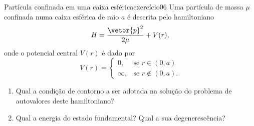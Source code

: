 \begin{exercício}{Partícula confinada em uma caixa esférica}{exercício06}
    Uma partícula de massa \(\mu\) confinada numa caixa esférica de raio \(a\) é descrita pelo hamiltoniano
    \begin{equation*}
        H = \frac{\vetor{p}^2}{2\mu} + V(r),
    \end{equation*}
    onde o potencial central \(V(r)\) é dado por
    \begin{equation*}
        V(r) = \begin{cases}
            0, &\text{se } r \in (0,a)\\
            \infty, &\text{se }r \notin (0,a).
        \end{cases}
    \end{equation*}
    \begin{enumerate}[label=(\alph*)]
        \item Qual a condição de contorno a ser adotada na solução do problema de autovalores deste hamiltoniano?
        \item Qual a energia do estado fundamental? Qual a sua degenerescência?
    \end{enumerate}
\end{exercício}
